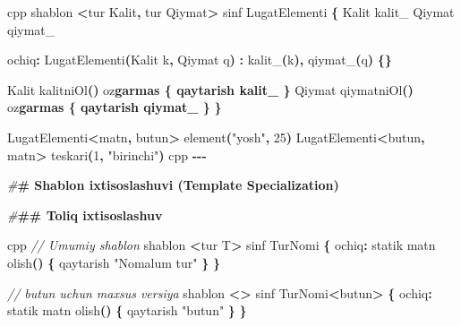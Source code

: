 \documentclass[a4paper,11pt,twoside,openright]{book}
\newenvironment{Shaded}{\begin{snugshade}}{\end{snugshade}}
\newcommand{\CharTok}[1]{\textcolor[rgb]{0.31,0.60,0.02}{#1}}
\newcommand{\CommentTok}[1]{\textcolor[rgb]{0.56,0.35,0.01}{\textit{#1}}}
\newcommand{\DecValTok}[1]{\textcolor[rgb]{0.00,0.00,0.81}{#1}}
\newcommand{\ErrorTok}[1]{\textcolor[rgb]{0.64,0.00,0.00}{\textbf{#1}}}
\newcommand{\NormalTok}[1]{#1}
\newcommand{\OperatorTok}[1]{\textcolor[rgb]{0.81,0.36,0.00}{\textbf{#1}}}
\newcommand{\PreprocessorTok}[1]{\textcolor[rgb]{0.56,0.35,0.01}{\textit{#1}}}
\newcommand{\StringTok}[1]{\textcolor[rgb]{0.31,0.60,0.02}{#1}}
\newcommand{\VariableTok}[1]{\textcolor[rgb]{0.00,0.00,0.00}{#1}}
\begin{document}
\begin{Shaded}
\begin{Highlighting}[]
\ErrorTok{\textasciigrave{}\textasciigrave{}\textasciigrave{}}\NormalTok{cpp}
\NormalTok{shablon }\OperatorTok{\textless{}}\NormalTok{tur Kalit}\OperatorTok{,}\NormalTok{ tur Qiymat}\OperatorTok{\textgreater{}}
\NormalTok{sinf LugatElementi }\OperatorTok{\{}
\NormalTok{    Kalit }\VariableTok{kalit\_}
\NormalTok{    Qiymat }\VariableTok{qiymat\_}

\NormalTok{ochiq}\OperatorTok{:}
\NormalTok{    LugatElementi}\OperatorTok{(}\NormalTok{Kalit k}\OperatorTok{,}\NormalTok{ Qiymat q}\OperatorTok{)} \OperatorTok{:} \VariableTok{kalit\_}\OperatorTok{(}\NormalTok{k}\OperatorTok{),} \VariableTok{qiymat\_}\OperatorTok{(}\NormalTok{q}\OperatorTok{)} \OperatorTok{\{\}}

\NormalTok{    Kalit kalitniOl}\OperatorTok{()}\NormalTok{ o}\CharTok{\textquotesingle{}z}\ErrorTok{garmas \{ qaytarish kalit\_ \}}
\NormalTok{    Qiymat qiymatniOl}\OperatorTok{()}\NormalTok{ o}\CharTok{\textquotesingle{}z}\ErrorTok{garmas \{ qaytarish qiymat\_ \}}
\OperatorTok{\}}

\NormalTok{LugatElementi}\OperatorTok{\textless{}}\NormalTok{matn}\OperatorTok{,}\NormalTok{ butun}\OperatorTok{\textgreater{}}\NormalTok{ element}\OperatorTok{(}\StringTok{"yosh"}\OperatorTok{,} \DecValTok{25}\OperatorTok{)}
\NormalTok{LugatElementi}\OperatorTok{\textless{}}\NormalTok{butun}\OperatorTok{,}\NormalTok{ matn}\OperatorTok{\textgreater{}}\NormalTok{ teskari}\OperatorTok{(}\DecValTok{1}\OperatorTok{,} \StringTok{"birinchi"}\OperatorTok{)}
\ErrorTok{\textasciigrave{}\textasciigrave{}\textasciigrave{}}\NormalTok{cpp}
\OperatorTok{{-}{-}{-}}

\PreprocessorTok{\#}\ErrorTok{\# Shablon ixtisoslashuvi (Template Specialization)}

\PreprocessorTok{\#}\ErrorTok{\#\# To\textquotesingle{}liq ixtisoslashuv}

\ErrorTok{\textasciigrave{}\textasciigrave{}\textasciigrave{}}\NormalTok{cpp}
\CommentTok{// Umumiy shablon}
\NormalTok{shablon }\OperatorTok{\textless{}}\NormalTok{tur T}\OperatorTok{\textgreater{}}
\NormalTok{sinf TurNomi }\OperatorTok{\{}
\NormalTok{ochiq}\OperatorTok{:}
\NormalTok{    statik matn olish}\OperatorTok{()} \OperatorTok{\{}\NormalTok{ qaytarish }\StringTok{"Noma\textquotesingle{}lum tur"} \OperatorTok{\}}
\OperatorTok{\}}

\CommentTok{// butun uchun maxsus versiya}
\NormalTok{shablon }\OperatorTok{\textless{}\textgreater{}}
\NormalTok{sinf TurNomi}\OperatorTok{\textless{}}\NormalTok{butun}\OperatorTok{\textgreater{}} \OperatorTok{\{}
\NormalTok{ochiq}\OperatorTok{:}
\NormalTok{    statik matn olish}\OperatorTok{()} \OperatorTok{\{}\NormalTok{ qaytarish }\StringTok{"butun"} \OperatorTok{\}}
\OperatorTok{\}}


\end{Highlighting}
\end{Shaded}
\end{document}

